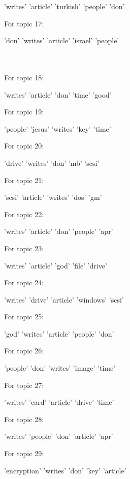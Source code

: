 \documentclass[12pt]{article}
\begin{document}
\begin{multicols}{2}
'writes' 'article' 'turkish' 'people' 'don' \par
For topic 17:
\par
'don' 'writes' 'article' 'israel' 'people' \par
~\\
~\\
For topic 18:
\par
'writes' 'article' 'don' 'time' 'good' \par
For topic 19:
\par
'people' 'jesus' 'writes' 'key' 'time' \par
For topic 20:
\par
'drive' 'writes' 'don' 'mb' 'scsi' \par
For topic 21:
\par
'scsi' 'article' 'writes' 'dos' 'gm' \par
For topic 22:
\par
'writes' 'article' 'don' 'people' 'apr' \par
For topic 23:
\par
'writes' 'article' 'god' 'file' 'drive' \par
For topic 24:
\par
'writes' 'drive' 'article' 'windows' 'scsi' \par
For topic 25:
\par
'god' 'writes' 'article' 'people' 'don' \par
For topic 26:
\par
'people' 'don' 'writes' 'image' 'time' \par
For topic 27:
\par
'writes' 'card' 'article' 'drive' 'time' \par
For topic 28:
\par
'writes' 'people' 'don' 'article' 'apr' \par
For topic 29:
\par
'encryption' 'writes' 'don' 'key' 'article' 
\end{multicols}
\end{document}
